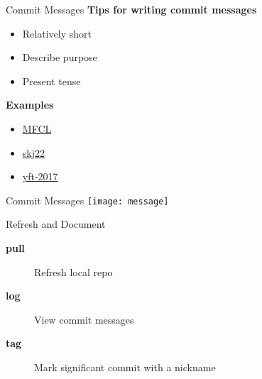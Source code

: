 \documentclass[aspectratio=169]{beamer}
\begin{document}
\begin{frame}{Commit Messages}\small
  {\bf\darkgray Tips for writing commit messages}
  \begin{itemize}
    \item[] Relatively short 
    \item[] Describe purpose 
    \item[] Present tense 
  \end{itemize}
  \vspace{3ex}
  {\bf\darkgray Examples}
  \begin{itemize}\blue
    \item[] \href{https://github.com/PacificCommunity/ofp-sam-mfcl/commits}
    {MFCL}
    \item[] \href{https://github.com/PacificCommunity/ofp-sam-skj22/commits}
    {skj22}
    \item[] \href{https://github.com/PacificCommunity/ofp-sam-yft-2017/commits}
    {yft-2017}
  \end{itemize}
\end{frame}


\begin{frame}{Commit Messages}\small
  \centering\texttt{[image: message]}
\end{frame}




\begin{frame}{Refresh and Document}\small
  \begin{description}
    \item[\bf pull] Refresh local repo \\[6ex]
    \item[\bf log] View commit messages \\[6ex]
    \item[\bf tag] Mark significant commit with a nickname \\[2ex]
  \end{description}
\end{frame}
\end{document}
